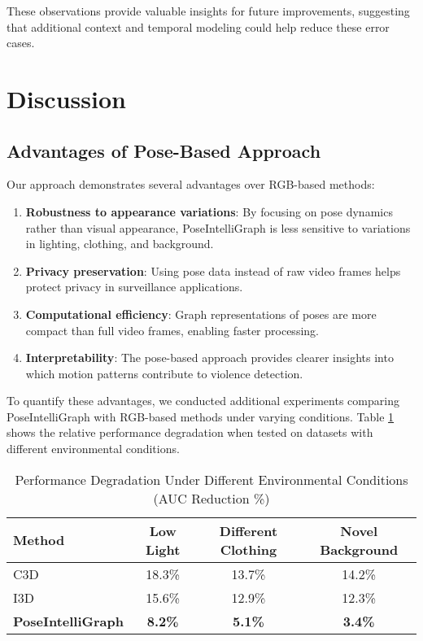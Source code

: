 \documentclass[conference]{IEEEtran}
\begin{document}
These observations provide valuable insights for future improvements,
suggesting that additional context and temporal modeling could help reduce
these error cases.

\section{Discussion}

\subsection{Advantages of Pose-Based Approach}
Our approach demonstrates several advantages over RGB-based methods:

\begin{enumerate}
    \item \textbf{Robustness to appearance variations}: By focusing on pose dynamics rather than visual appearance, PoseIntelliGraph is less sensitive to variations in lighting, clothing, and background.
    \item \textbf{Privacy preservation}: Using pose data instead of raw video frames helps protect privacy in surveillance applications.
    \item \textbf{Computational efficiency}: Graph representations of poses are more compact than full video frames, enabling faster processing.
    \item \textbf{Interpretability}: The pose-based approach provides clearer insights into which motion patterns contribute to violence detection.
\end{enumerate}

To quantify these advantages, we conducted additional experiments comparing
PoseIntelliGraph with RGB-based methods under varying conditions. Table
\ref{tab:robustness} shows the relative performance degradation when tested on
datasets with different environmental conditions.

\begin{table}[htbp]
    \caption{Performance Degradation Under Different Environmental Conditions (AUC Reduction \%)}
    \begin{center}
        \renewcommand{\arraystretch}{1.2}
        \begin{tabular}{|l|c|c|c|}
            \hline
            \rowcolor[gray]{0.9}
            \textbf{Method}            & \textbf{Low Light} & \textbf{Different Clothing} & \textbf{Novel Background} \\
            \hline
            C3D \cite{wu2020not}       & 18.3\%             & 13.7\%                      & 14.2\%                    \\
            \hline
            I3D \cite{carreira2017quo} & 15.6\%             & 12.9\%                      & 12.3\%                    \\
            \hline
            \textbf{PoseIntelliGraph}  & \textbf{8.2\%}     & \textbf{5.1\%}              & \textbf{3.4\%}            \\
            \hline
        \end{tabular}
    \end{center}
    \label{tab:robustness}
\end{table}
\end{document}
